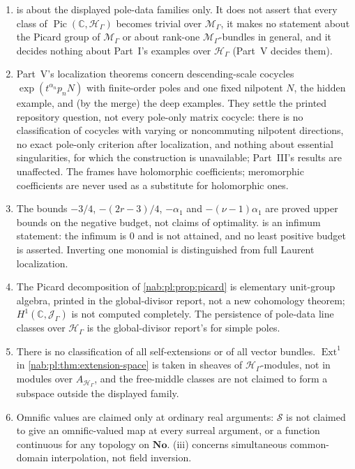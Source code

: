 \documentclass[11pt,letterpaper]{article}
\theoremstyle{definition}
\theoremstyle{remark}
\newcommand{\C}{\mathbb C}
\newcommand{\No}{\mathbf{No}}
\newcommand{\HH}{\mathscr H_\Gamma}
\newcommand{\JJ}{\mathscr J_\Gamma}
\newcommand{\MM}{\mathscr M_\Gamma}
\newcommand{\Pic}{\operatorname{Pic}}
\newcommand{\Ext}{\operatorname{Ext}}
\numberwithin{equation}{section}
\begin{document}
\begin{enumerate}
\item\label{nab:loc:nc:picard}
 is about the displayed pole-data families only.
It does not assert that every class of $\Pic(\C,\HH)$ becomes trivial over
$\MM$, it makes no statement about the Picard group of $\MM$ or about rank-one
$\MM$-bundles in general, and it decides nothing about Part~I's examples over
$\HH$ (Part~V decides them).

\item\label{nab:pl:nc:fixedN}
Part~V's localization theorems concern descending-scale cocycles
$\exp(t^{\alpha_n}p_nN)$ with finite-order poles and one fixed nilpotent $N$,
the hidden example, and (by the merge) the deep examples. They settle the
printed repository question, not every pole-only matrix cocycle: there is no
classification of cocycles with varying or noncommuting nilpotent directions,
no exact pole-only criterion after localization, and nothing about essential
singularities, for which the construction is unavailable; Part~III's results
are unaffected. The frames have holomorphic coefficients; meromorphic
coefficients are never used as a substitute for holomorphic ones.

\item\label{nab:pl:nc:budget}
The bounds $-3/4$, $-(2r-3)/4$, $-\alpha_1$ and $-(\nu-1)\alpha_1$ are proved
upper bounds on the negative budget, not claims of optimality.
 is an infimum statement: the infimum is $0$ and is
not attained, and no least positive budget is asserted. Inverting one monomial
is distinguished from full Laurent localization.

\item\label{nab:pl:nc:picard}
The Picard decomposition of \cref{nab:pl:prop:picard} is elementary unit-group
algebra, printed in the global-divisor report, not a new cohomology theorem;
$H^1(\C,\JJ)$ is not computed completely. The persistence of pole-data line
classes over $\HH$ is the global-divisor report's for simple poles.

\item\label{nab:pl:nc:extensions}
There is no classification of all self-extensions or of all vector bundles.
$\Ext^1$ in \cref{nab:pl:thm:extension-space} is taken in sheaves of
$\HH$-modules, not in modules over $A_{\HH}$, and the free-middle classes are
not claimed to form a subspace outside the displayed family.

\item\label{nab:pl:nc:omnific}
Omnific values are claimed only at ordinary real arguments: $\mathcal S$ is not
claimed to give an omnific-valued map at every surreal argument, or a function
continuous for any topology on $\No$. (iii) concerns
simultaneous common-domain interpolation, not field inversion.


\end{enumerate}
\end{document}
